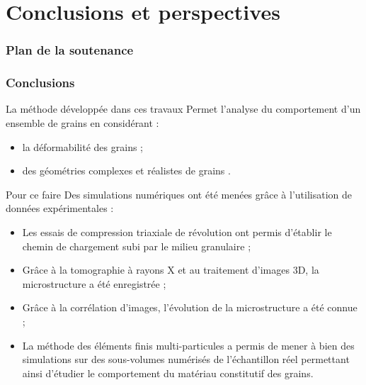 \documentclass[8pt]{beamer}
\begin{document}
\section[Conclusions / Perspectives]{Conclusions et perspectives}
\begin{frame}
	\frametitle{Plan de la soutenance}
	\tableofcontents[currentsection]
\end{frame}
\begin{frame}
	\frametitle{Conclusions}
	\vfill
	\begin{block}{La méthode développée dans ces travaux}
		Permet l'analyse du comportement d'un ensemble de grains en considérant :
		\begin{itemize}[label=$\rightarrow$]
			\item la déformabilité des grains ;
			\item des géométries complexes et réalistes de grains .
		\end{itemize}
	\end{block}\vfill
	\begin{block}{Pour ce faire}
		Des simulations numériques ont été menées grâce à l'utilisation de données expérimentales :
		\begin{itemize}[label=$\rightarrow$]
			\item Les essais de compression triaxiale de révolution ont permis d'établir le chemin de chargement subi par le milieu granulaire ;
			\item Grâce à la tomographie à rayons X et au traitement d'images 3D, la microstructure a été enregistrée ;
			\item Grâce à la corrélation d'images, l'évolution de la microstructure a été connue ;
			\item La méthode des éléments finis multi-particules a permis de mener à bien des simulations sur des sous-volumes numérisés de l'échantillon réel permettant ainsi d'étudier le comportement du matériau constitutif des grains.
		\end{itemize}
	\end{block}\vfill
\end{frame}
\end{document}
